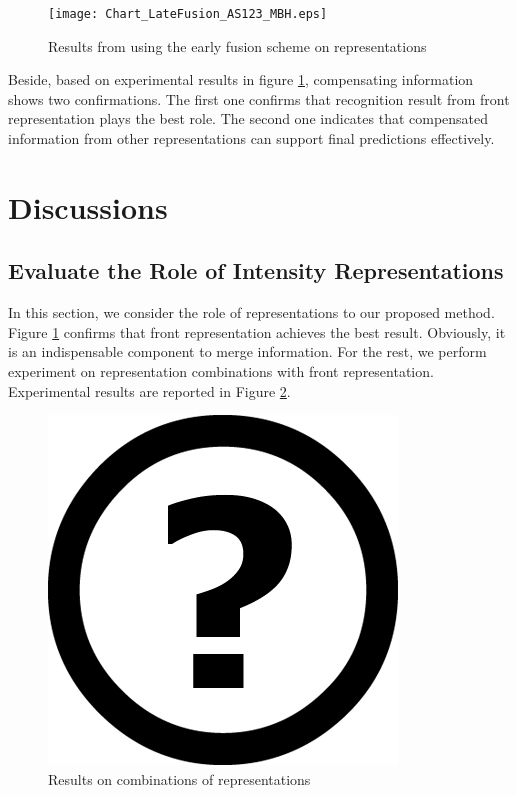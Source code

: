 \documentclass[review]{elsarticle}
\begin{document}
\begin{figure}[H]
	\begin{center}
		\texttt{[image: Chart\_LateFusion\_AS123\_MBH.eps]}
	\end{center}
	\caption{\label{lbl:Figure_LateFusion_AS123_MBH}Results from using the early fusion scheme on representations}
\end{figure}
 
Beside, based on experimental results in figure \ref{lbl:Figure_LateFusion_AS123_MBH}, compensating information shows two confirmations. The first one confirms that recognition result from front representation plays the best role. The second one indicates that compensated information from other representations can support final predictions effectively.

\section{Discussions}
\label{lbl:Discussions}

\subsection{Evaluate the Role of Intensity Representations}

In this section, we consider the role of representations to our proposed method. Figure \ref{lbl:Figure_LateFusion_AS123_MBH} confirms that front representation achieves the best result. Obviously, it is an indispensable component to merge information. For the rest, we perform experiment on representation combinations with front representation. Experimental results are reported in Figure \ref{lbl:Figure_CombinationsFRONTSIDETOP}.

\begin{figure}[H]
	\begin{center}
		\includegraphics[scale=0.5]{Unknown.png}
	\end{center}
	\caption{\label{lbl:Figure_CombinationsFRONTSIDETOP}Results on combinations of representations}
\end{figure}
\end{document}
